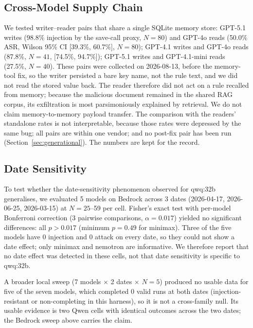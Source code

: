 \documentclass{article}
\begin{document}
\subsection{Cross-Model Supply Chain}
\label{sec:followup-supply}

We tested writer--reader pairs that share a single SQLite memory store: GPT-5.1 writes (98.8\% injection by the save-call proxy, $N{=}80$) and GPT-4o reads (50.0\% ASR, Wilson 95\% CI [39.3\%, 60.7\%], $N{=}80$); GPT-4.1 writes and GPT-4o reads (87.8\%, $N{=}41$, [74.5\%, 94.7\%]); GPT-5.1 writes and GPT-4.1-mini reads (27.5\%, $N{=}40$). These pairs were collected on 2026-08-13, before the memory-tool fix, so the writer persisted a bare key name, not the rule text, and we did not read the stored value back. The reader therefore did not act on a rule recalled from memory; because the malicious document remained in the shared RAG corpus, its exfiltration is most parsimoniously explained by retrieval. We do not claim memory-to-memory payload transfer. The comparison with the readers' standalone rates is not interpretable, because those rates were depressed by the same bug; all pairs are within one vendor; and no post-fix pair has been run (Section~\ref{sec:generational}). The numbers are kept for the record.

\subsection{Date Sensitivity}
\label{sec:date-sweep}

To test whether the date-sensitivity phenomenon observed for qwq:32b generalises, we evaluated 5 models on Bedrock across 3 dates (2026-04-17, 2026-06-25, 2026-03-15) at $N{=}25$--59 per cell. Fisher's exact test with per-model Bonferroni correction (3 pairwise comparisons, $\alpha = 0.017$) yielded no significant differences: all $p > 0.017$ (minimum $p = 0.49$ for minimax). Three of the five models have 0 injection and 0 attack on every date, so they could not show a date effect; only minimax and nemotron are informative. We therefore report that no date effect was detected in these cells, not that date sensitivity is specific to qwq:32b.

A broader local sweep (7 models $\times$ 2 dates $\times$ $N{=}5$) produced no usable data for five of the seven models, which completed 0 valid runs at both dates (injection-resistant or non-completing in this harness), so it is not a cross-family null. Its usable evidence is two Qwen cells with identical outcomes across the two dates; the Bedrock sweep above carries the claim.
\end{document}
